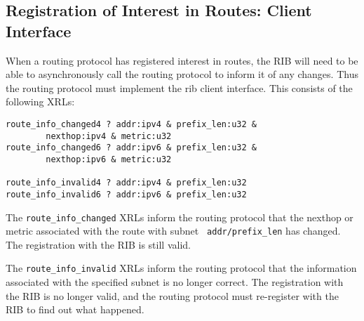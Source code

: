 \documentclass[11pt]{article}
\begin{document}
\subsection{Registration of Interest in Routes: Client Interface}
When a routing protocol has registered interest in routes, the RIB
will need to be able to asynchronously call the routing protocol to
inform it of any changes.  Thus the routing protocol must implement
the rib client interface.  This consists of the following XRLs:
\begin{verbatim}
route_info_changed4 ? addr:ipv4 & prefix_len:u32 & 
        nexthop:ipv4 & metric:u32
route_info_changed6 ? addr:ipv6 & prefix_len:u32 & 
        nexthop:ipv6 & metric:u32

route_info_invalid4 ? addr:ipv4 & prefix_len:u32
route_info_invalid6 ? addr:ipv6 & prefix_len:u32
\end{verbatim}
The {\tt route\_info\_changed} XRLs inform the routing protocol that the
nexthop or metric associated with the route with subnet {\tt
addr/prefix\_len} has changed.  The registration with the RIB is still
valid.

The {\tt route\_info\_invalid} XRLs inform the routing protocol that the
information associated with the specified subnet is no longer correct.
The registration with the RIB is no longer valid, and the routing
protocol must re-register with the RIB to find out what happened.
\end{document}
